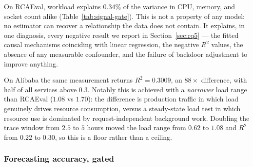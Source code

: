 \documentclass[journal, 10pt]{IEEEtran}
\begin{document}
On RCAEval, workload explains $0.34\%$ of the variance in CPU, memory, and socket
count alike (Table~\ref{tab:signal-gate}). This is not a property of any model:
no estimator can recover a relationship the data does not contain. It explains,
in one diagnosis, every negative result we report in Section~\ref{sec:rq5} ---
the fitted causal mechanisms coinciding with linear regression, the negative
$R^2$ values, the absence of any measurable confounder, and the failure of
backdoor adjustment to improve anything.

On Alibaba the same measurement returns $R^2=0.3009$, an $88{\times}$ difference,
with half of all services above $0.3$. Notably this is achieved with a
\emph{narrower} load range than RCAEval ($1.08$ vs $1.70$): the difference is
production traffic in which load genuinely drives resource consumption, versus a
steady-state load test in which resource use is dominated by request-independent
background work. Doubling the trace window from $2.5$ to $5$ hours moved the
load range from $0.62$ to $1.08$ and $R^2$ from $0.22$ to $0.30$, so this is a
floor rather than a ceiling.

\subsubsection{Forecasting accuracy, gated}
\end{document}
